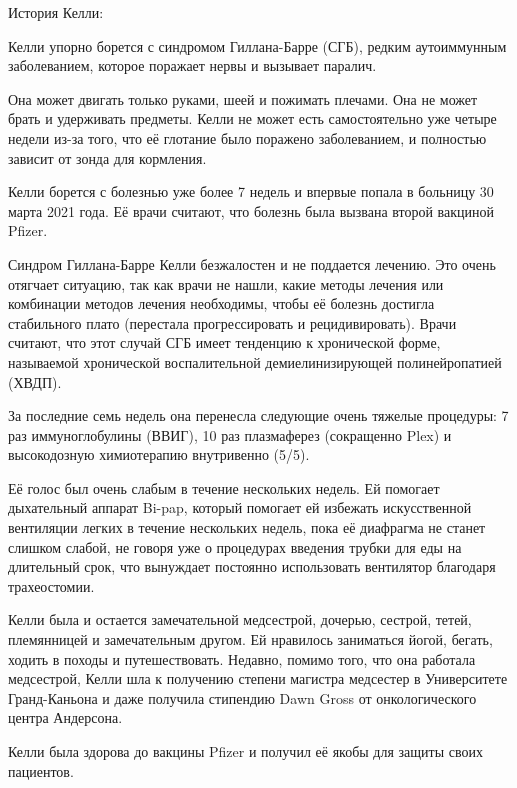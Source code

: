 История Келли:

Келли упорно борется с синдромом Гиллана-Барре (СГБ), редким аутоиммунным
заболеванием, которое поражает нервы и вызывает паралич.

Она может двигать только руками, шеей и пожимать плечами. Она не может брать и
удерживать предметы. Келли не может есть самостоятельно уже четыре недели из-за
того, что её глотание было поражено заболеванием, и полностью зависит от зонда
для кормления.

Келли борется с болезнью уже более 7 недель и впервые попала в больницу 30 марта
2021 года. Её врачи считают, что болезнь была вызвана второй вакциной Pfizer.

Синдром Гиллана-Барре Келли безжалостен и не поддается лечению. Это очень
отягчает ситуацию, так как врачи не нашли, какие методы лечения или комбинации
методов лечения необходимы, чтобы её болезнь достигла стабильного плато
(перестала прогрессировать и рецидивировать). Врачи считают, что этот случай СГБ
имеет тенденцию к хронической форме, называемой хронической воспалительной
демиелинизирующей полинейропатией (ХВДП).

За последние семь недель она перенесла следующие очень тяжелые процедуры: 7 раз
иммуноглобулины (ВВИГ), 10 раз плазмаферез (сокращенно Plex) и высокодозную
химиотерапию внутривенно (5/5).

Её голос был очень слабым в течение нескольких недель. Ей помогает дыхательный
аппарат Bi-pap, который помогает ей избежать искусственной вентиляции легких в
течение нескольких недель, пока её диафрагма не станет слишком слабой, не говоря
уже о процедурах введения трубки для еды на длительный срок, что вынуждает
постоянно использовать вентилятор благодаря трахеостомии.

Келли была и остается замечательной медсестрой, дочерью, сестрой, тетей,
племянницей и замечательным другом. Ей нравилось заниматься йогой, бегать,
ходить в походы и путешествовать. Недавно, помимо того, что она работала
медсестрой, Келли шла к получению степени магистра медсестер в Университете
Гранд-Каньона и даже получила стипендию Dawn Gross от онкологического центра
Андерсона.

Келли была здорова до вакцины Pfizer и получил её якобы для защиты своих
пациентов.
